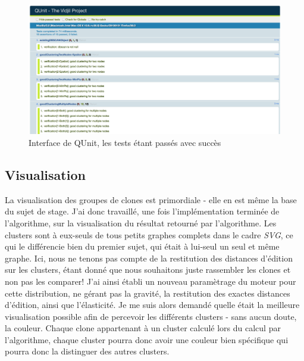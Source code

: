 \documentclass[pdftex,12pt,a4paper]{report}
\begin{document}
\begin{spacing}{1.2}
\begin{figure}[H]
\begin{center}
	\includegraphics[scale=0.35]{img/QUnit.jpg}
\end{center}
\caption{Interface de QUnit, les tests étant passés avec succès}
\end{figure}

\subsection{Visualisation}

La visualisation des groupes de clones est primordiale - elle en est même la base du sujet de stage. J'ai donc travaillé, une fois l'implémentation terminée de l'algorithme, sur la visualisation du résultat retourné par l'algorithme. Les clusters sont à eux-seuls de tous petits graphes complets dans le cadre \textit{SVG}, ce qui le différencie bien du premier sujet, qui était à lui-seul un seul et même graphe. Ici, nous ne tenons pas compte de la restitution des distances d'édition sur les clusters, étant donné que nous souhaitons juste rassembler les clones et non pas les comparer! J'ai ainsi établi un nouveau paramètrage du moteur pour cette distribution, ne gérant pas la gravité, la restitution des exactes distances d'édition, ainsi que l'élasticité.
\newline
Je me suis alors demandé quelle était la meilleure visualisation possible afin de percevoir les différents clusters - sans aucun doute, la couleur. Chaque clone appartenant à un cluster calculé lors du calcul par l'algorithme, chaque cluster pourra donc avoir une couleur bien spécifique qui pourra donc la distinguer des autres clusters.


\end{spacing}
\end{document}
